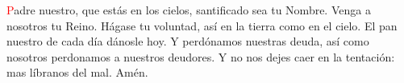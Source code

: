 \textcolor{red}{P}adre nuestro, que estás en los cielos, santificado sea tu Nombre. Venga a nosotros tu Reino.
Hágase tu voluntad, así en la tierra como en el cielo. El pan nuestro de cada día dánosle hoy.
Y perdónamos nuestras deuda, así como nosotros perdonamos a nuestros deudores.
Y no nos dejes caer en la tentación: mas líbranos del mal. Amén.